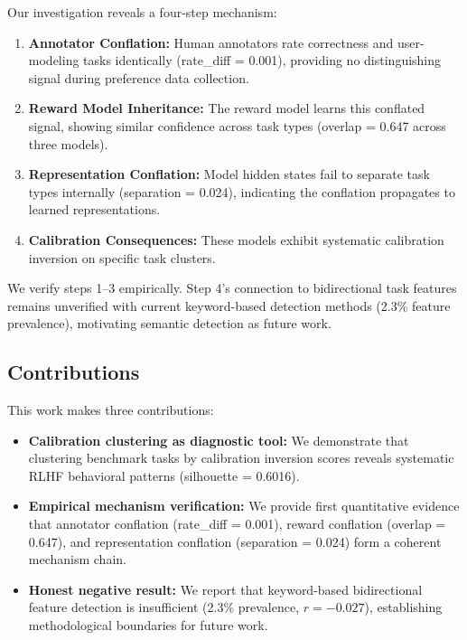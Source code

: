 Our investigation reveals a four-step mechanism:

\begin{enumerate}
    \item \textbf{Annotator Conflation:} Human annotators rate correctness and user-modeling tasks identically (rate\_diff = 0.001), providing no distinguishing signal during preference data collection.

    \item \textbf{Reward Model Inheritance:} The reward model learns this conflated signal, showing similar confidence across task types (overlap = 0.647 across three models).

    \item \textbf{Representation Conflation:} Model hidden states fail to separate task types internally (separation = 0.024), indicating the conflation propagates to learned representations.

    \item \textbf{Calibration Consequences:} These models exhibit systematic calibration inversion on specific task clusters.
\end{enumerate}

We verify steps 1--3 empirically. Step 4's connection to bidirectional task features remains unverified with current keyword-based detection methods (2.3\% feature prevalence), motivating semantic detection as future work.

\subsection{Contributions}

This work makes three contributions:

\begin{itemize}
    \item \textbf{Calibration clustering as diagnostic tool:} We demonstrate that clustering benchmark tasks by calibration inversion scores reveals systematic RLHF behavioral patterns (silhouette = 0.6016).

    \item \textbf{Empirical mechanism verification:} We provide first quantitative evidence that annotator conflation (rate\_diff = 0.001), reward conflation (overlap = 0.647), and representation conflation (separation = 0.024) form a coherent mechanism chain.

    \item \textbf{Honest negative result:} We report that keyword-based bidirectional feature detection is insufficient (2.3\% prevalence, $r = -0.027$), establishing methodological boundaries for future work.
\end{itemize}
